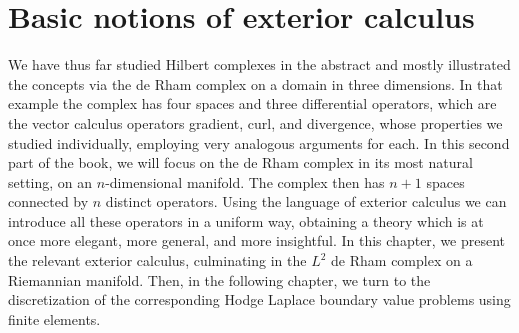 \clearpage\setcounter{section}{5}
\section{{Basic notions of exterior calculus}}\label{chap:exterior-calculus}

{We have thus far studied Hilbert complexes in the abstract and mostly illustrated the concepts via the de Rham complex on a domain in three dimensions. In that example the complex has four spaces and three differential operators, which are the vector calculus operators gradient, curl, and divergence, whose properties we studied individually, employing very analogous arguments for each. In this second part of the book, we will focus on the de Rham complex in its most natural setting, on an $n$-dimensional manifold. The complex then has $n+1$ spaces connected by $n$ distinct operators. Using the language of exterior calculus we can introduce all these operators in a uniform way, obtaining a theory which is at once more elegant, more general, and more insightful. In this chapter, we present the relevant exterior calculus, culminating in the $L^2$ de Rham complex on a Riemannian manifold. Then, in the following chapter, we turn to the discretization of the corresponding Hodge Laplace boundary value problems using finite elements.}
